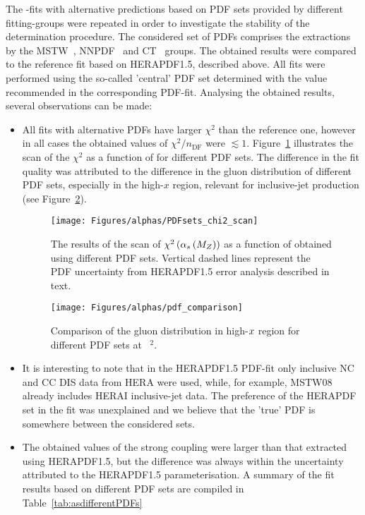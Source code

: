 The \asz-fits with alternative predictions based on PDF sets provided by different fitting-groups were repeated in order to investigate the stability of the \asz determination procedure. The considered set of PDFs comprises the extractions by the MSTW~\cite{}, NNPDF~\cite{} and CT~\cite{} groups. The obtained results were compared to the reference fit based on HERAPDF1.5, described above. All fits were performed using the so-called 'central' PDF set determined with the \asz value recommended in the corresponding PDF-fit. Analysing the obtained results, several observations can be made:
\begin{itemize}
 \item All fits with alternative PDFs have larger $\chi^2$ than the reference one, however in all cases the obtained values of $\chi^2/n_\text{DF}$ were $\lesssim 1$. Figure~\ref{fig:chi2scanpdf} illustrates the scan of the $\chi^2$ as a function of \asz for different PDF sets. The difference in the fit quality was attributed to the difference in the gluon distribution of different PDF sets, especially in the high-$x$ region, relevant for inclusive-jet production (see Figure~\ref{fig:pdf_gluon_comp}).
\begin{figure}[t]
 \centering
 \texttt{[image: Figures/alphas/PDFsets\_chi2\_scan]}
 \caption{The results of the scan of $\chi^2\left(\mbox{$\alpha_{s}\left(M_{Z}\right)$}\right)$ as a function of \asz obtained using different PDF sets. Vertical dashed lines represent the PDF uncertainty from HERAPDF1.5 error analysis described in text.}
 \label{fig:chi2scanpdf}
\end{figure}
\begin{figure}[ht]
 \centering
 \texttt{[image: Figures/alphas/pdf\_comparison]}
 \caption{Comparison of the gluon distribution in high-$\mbox{${x}$}$ region for different PDF sets at ~\GeV$^2$.}
 \label{fig:pdf_gluon_comp}
\end{figure}
 \item It is interesting to note that in the HERAPDF1.5 PDF-fit only inclusive NC and CC DIS data from HERA were used, while, for example, MSTW08 already includes HERAI inclusive-jet data. The preference of the HERAPDF set in the fit was unexplained and we believe that the 'true' PDF is somewhere between the considered sets.
 \item The obtained values of the strong coupling were larger than that extracted using HERAPDF1.5, but the difference was always within the uncertainty attributed to the HERAPDF1.5 parameterisation. A summary of the fit results based on different PDF sets are compiled in Table~\ref{tab:asdifferentPDFs}

\end{itemize}
